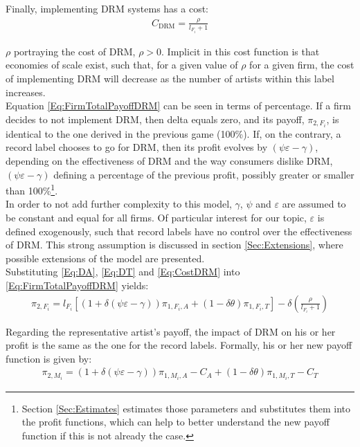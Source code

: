 \documentclass[a4paper,12pt]{article}
\numberwithin{equation}{section}
\newcommand{\drm}{\text{DRM}}
\newcommand{\artistpayoff}[2]{\pi_{#1, M_{#2}}}
\newcommand{\firmpayoff}[2]{\pi_{{#1}, F_{#2}}}
\newcommand{\artistalbum}[2]{\pi_{#1, M_{#2}, A}}
\newcommand{\artistticket}[2]{\pi_{#1, M_{#2}, T}}
\newcommand{\firmalbum}[2]{\pi_{#1, F_{#2}, A}}
\newcommand{\firmticket}[2]{\pi_{#1, F_{#2}, T}}
\newcommand{\drminf}{(\psi \varepsilon - \gamma)}
\begin{document}
Finally, implementing DRM systems has a cost:
\begin{eqnarray}
C_\drm = \frac{\rho}{l_{F_i} + 1}
\label{Eq:CostDRM}
\end{eqnarray}

$\rho$ portraying the cost of DRM, $\rho > 0$. Implicit in this cost function is that economies of scale exist, such that, for a given value of $\rho$ for a given firm, the cost of implementing DRM will decrease as the number of artists within this label increases.\\

Equation \eqref{Eq:FirmTotalPayoffDRM} can be seen in terms of percentage. If a firm decides to not implement DRM, then delta equals zero, and its payoff, $\firmpayoff{2}{i}$, is identical to the one derived in the previous game (100\%). If, on the contrary, a record label chooses to go for DRM, then its profit evolves by $\drminf$, depending on the effectiveness of DRM and the way consumers dislike DRM, $\drminf$ defining a percentage of the previous profit, possibly greater or smaller than 100\%\footnote {
Section \ref{Sec:Estimates} estimates those parameters and substitutes them into the profit functions, which can help to better understand the new payoff function if this is not already the case.
}.\\

In order to not add further complexity to this model, $\gamma$, $\psi$ and $\varepsilon$ are assumed to be constant and equal for all firms. Of particular interest for our topic, $\varepsilon$ is defined exogenously, such that record labels have no control over the effectiveness of DRM. This strong assumption is discussed in section \ref{Sec:Extensions}, where possible extensions of the model are presented.\\

Substituting \eqref{Eq:DA}, \eqref{Eq:DT} and \eqref{Eq:CostDRM} into \eqref{Eq:FirmTotalPayoffDRM} yields:
\begin{eqnarray}
\firmpayoff{2}{i} = l_{F_i} \left[
	(1 + \delta \drminf) \firmalbum{1}{i} +
	(1 - \delta \theta) \firmticket{1}{i}
\right]
- \delta \left( \frac{\rho}{l_{F_i} + 1} \right)
\end{eqnarray}

Regarding the representative artist’s payoff, the impact of DRM on his or her profit is the same as the one for the record labels. Formally, his or her new payoff function is given by:
\begin{eqnarray}
\artistpayoff{2}{i} = (1 + \delta \drminf) \artistalbum{1}{i} - C_A +
						(1 - \delta \theta) \artistticket{1}{i} - C_T
\end{eqnarray}
\end{document}
